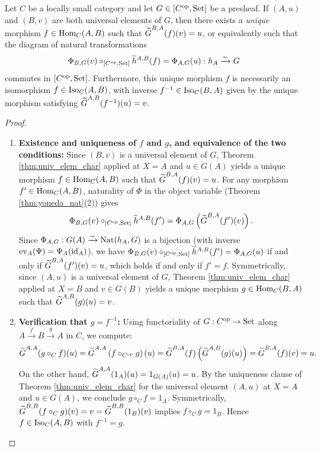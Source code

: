 \documentclass[10pt,a4paper]{article}
\renewcommand{\myprf}{\begin{proof}}
\renewcommand{\myqed}{\end{proof}}
\begin{document}
\begin{theorem}\label{thm:rep_unique}
Let $C$ be a locally small category and let $G \in [C^{\textrm{op}}, {\textrm{Set}}]$ be a presheaf. If $(A, u)$ and $(B, v)$ are both universal elements of $G$, then there exists a \emph{unique} morphism $f \in {\textrm{Hom}}_C(A, B)$ such that ${\widetilde{G}\textrm{}}^{B,A}(f)(v) = u$, or equivalently such that the diagram of natural transformations
$$\Phi_{B,G}(v) \circ_{[C^{\textrm{op}},{\textrm{Set}}]} \widetilde{h}^{A,B}(f) = \Phi_{A,G}(u) : h_A \xrightarrow{\sim} G$$
commutes in $[C^{\textrm{op}}, {\textrm{Set}}]$. Furthermore, this unique morphism $f$ is necessarily an isomorphism $f \in {\mathrm{Iso}}_C(A, B)$, with inverse $f^{-1} \in {\mathrm{Iso}}_C(B, A)$ given by the unique morphism satisfying ${\widetilde{G}\textrm{}}^{A,B}(f^{-1})(u) = v$.
\end{theorem}
\myprf
\begin{enumerate}
\item \textbf{Existence and uniqueness of $f$ and $g$, and equivalence of the two conditions:} Since $(B, v)$ is a universal element of $G$, Theorem \ref{thm:univ_elem_char} applied at $X = A$ and $u \in G(A)$ yields a unique morphism $f \in {\textrm{Hom}}_C(A, B)$ such that ${\widetilde{G}\textrm{}}^{B,A}(f)(v) = u$. For any morphism $f' \in {\textrm{Hom}}_C(A, B)$, naturality of $\Phi$ in the object variable (Theorem \ref{thm:yoneda_nat}(2)) gives
$$\Phi_{B,G}(v) \circ_{[C^{\textrm{op}},{\textrm{Set}}]} \widetilde{h}^{A,B}(f') = \Phi_{A,G}\left({\widetilde{G}\textrm{}}^{B,A}(f')(v)\right).$$
Since $\Phi_{A,G} : G(A) \xrightarrow{\sim} {\textrm{Nat}}(h_A, G)$ is a bijection (with inverse $\mathrm{ev}_A(\Psi) = \Psi_A({\textrm{id}}_A)$), we have $\Phi_{B,G}(v) \circ_{[C^{\textrm{op}},{\textrm{Set}}]} \widetilde{h}^{A,B}(f') = \Phi_{A,G}(u)$ if and only if ${\widetilde{G}\textrm{}}^{B,A}(f')(v) = u$, which holds if and only if $f' = f$. Symmetrically, since $(A, u)$ is a universal element of $G$, Theorem \ref{thm:univ_elem_char} applied at $X = B$ and $v \in G(B)$ yields a unique morphism $g \in {\textrm{Hom}}_C(B, A)$ such that ${\widetilde{G}\textrm{}}^{A,B}(g)(u) = v$.
\item \textbf{Verification that $g = f^{-1}$:} Using functoriality of $G : C^{\textrm{op}} \to {\textrm{Set}}$ along $A \xrightarrow{f} B \xrightarrow{g} A$ in $C$, we compute:
$${\widetilde{G}\textrm{}}^{A,A}(g \circ_C f)(u) = {\widetilde{G}\textrm{}}^{A,A}\left(f \circ_{C^{\textrm{op}}} g\right)(u) = {\widetilde{G}\textrm{}}^{B,A}(f)\left({\widetilde{G}\textrm{}}^{A,B}(g)(u)\right) = {\widetilde{G}\textrm{}}^{B,A}(f)(v) = u.$$
On the other hand, ${\widetilde{G}\textrm{}}^{A,A}(1_A)(u) = 1_{G(A)}(u) = u$. By the uniqueness clause of Theorem \ref{thm:univ_elem_char} for the universal element $(A, u)$ at $X = A$ and $u \in G(A)$, we conclude $g \circ_C f = 1_A$. Symmetrically, ${\widetilde{G}\textrm{}}^{B,B}(f \circ_C g)(v) = v = {\widetilde{G}\textrm{}}^{B,B}(1_B)(v)$ implies $f \circ_C g = 1_B$. Hence $f \in {\mathrm{Iso}}_C(A, B)$ with $f^{-1} = g$.
\end{enumerate}
\myqed
\end{document}
